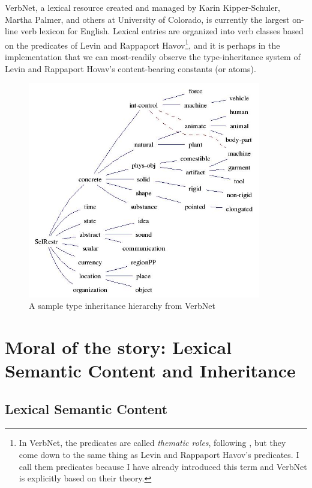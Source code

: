 VerbNet, a lexical resource created and managed by Karin Kipper-Schuler, Martha Palmer, and others at University of Colorado, is currently the largest on-line verb lexicon for English. Lexical entries are organized into verb classes based on the predicates of Levin and Rappaport Havov\footnote{In VerbNet, the predicates are called \emph{thematic roles}, following \cite{Jackendoff_semantic_1972}, but they come down to the same thing as Levin and Rappaport Havov's predicates. I call them predicates because I have already introduced this term and VerbNet is explicitly based on their theory.}, and it is perhaps in the implementation that we can most-readily observe the type-inheritance system of Levin and Rappaport Hovav's content-bearing constants (or atoms).
\par\vspace{3mm}
\begin{figure}[h]
  \centering
      \includegraphics[width=4in]{./Chapters/Ch2/verbnetinheritance.jpg}
  \caption{A sample type inheritance hierarchy from VerbNet}
\end{figure}

\section{Moral of the story: Lexical Semantic Content and Inheritance}

\subsection{Lexical Semantic Content}

